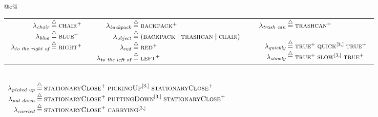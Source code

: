 \begin{table}
{\begin{tabular}{@{}c@{}}
\begin{tabular}{@{}c@{}c@{\hspace{-20ex}}c@{}}
\begin{math}
\begin{array}[t]{r@{\;\define\;}l}
          \lambda_{\textit{chair}} & \textsc{chair}\plus\\
          \lambda_{\textit{blue}} & \textsc{blue}\plus\\
          \lambda_{\textit{to the right of}} & \textsc{right}\plus
          \end{array}
        \end{math}&
        \begin{math}
          \begin{array}[t]{r@{\;\define\;}l}
          \lambda_{\textit{backpack}} & \textsc{backpack}\plus\\
          \lambda_{\textit{object}} &
          (\textsc{backpack}\;|\;\textsc{trashcan}\;|\;\textsc{chair})
          \plus\\
          \lambda_{\textit{red}} & \textsc{red}\plus\\
          \lambda_{\textit{to the left of}} & \textsc{left}\plus
          \end{array}
        \end{math}&
        \begin{math}
          \begin{array}[t]{r@{\;}c@{\;}l}
          \lambda_{\textit{trash can}} & \define & \textsc{trashcan} \plus\\
          \\[0.5ex]             %
          \lambda_{\textit{quickly}} & \define &
          \textsc{true}\plus\;\textsc{quick}\dagr\;\textsc{true}\plus\\
          \lambda_{\textit{slowly}} & \define &
          \textsc{true}\plus\;\textsc{slow}\dagr\;\textsc{true}\plus
          \end{array}
        \end{math}
      \end{tabular}\\
      \begin{math}
        \begin{array}[t]{r@{\;\define\;}l}
          \lambda_{\textit{picked up}} &
          \textsc{stationaryClose}\plus\;
          \textsc{pickingUp}\dagr\;
          \textsc{stationaryClose}\plus\\
          \lambda_{\textit{put down}} &
          \textsc{stationaryClose}\plus\;
          \textsc{puttingDown}\dagr\;
          \textsc{stationaryClose}\plus\\
          \lambda_{\textit{carried}} &
          \textsc{stationaryClose}\plus\;
          \textsc{carrying}\dagr\;

\end{array}
\end{math}
\end{tabular}}
\end{table}
